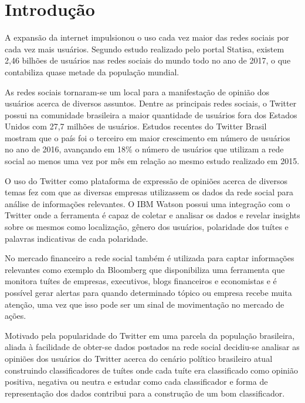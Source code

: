 \chapter{Introdução}

A expansão da internet impulsionou o uso cada vez maior das redes sociais por cada vez mais
usuários. Segundo estudo realizado pelo portal Statisa\cite{statisa}, existem
2,46 bilhões de usuários nas redes sociais do mundo todo no ano de 2017, o que contabiliza
quase metade da população mundial.

As redes sociais tornaram-se um local para a manifestação de opinião dos usuários acerca de
diversos assuntos. Dentre as principais redes sociais, o Twitter possui na comunidade brasileira
a maior quantidade de usuários fora dos Estados Unidos com 27,7 milhões de usuários.
Estudos recentes do Twitter Brasil mostram que o país foi o terceiro em maior crescimento em número
de usuários no ano de 2016, avançando em 18\% o número de usuários que utilizam a rede social ao
menos uma vez por mês em relação ao mesmo estudo realizado em 2015.\cite{twitterFolha}

O uso do Twitter como plataforma de expressão de opiniões acerca de diversos temas fez com que as
diversas empresas utilizassem os dados da rede social para análise de informações relevantes. O IBM
Watson possui uma integração com o Twitter onde a ferramenta é capaz de coletar e analisar os dados
e revelar insights sobre os mesmos como localização, gênero dos usuários, polaridade dos tuítes
e palavras indicativas de cada polaridade. \cite{twitterWatson}

No mercado financeiro a rede social também é utilizada para captar informações relevantes como exemplo
da Bloomberg que disponibiliza uma ferramenta que monitora tuítes de empresas, executivos, blogs
financeiros e economistas e é possível gerar alertas para quando determinado tópico ou empresa recebe
muita atenção, uma vez que isso pode ser um sinal de movimentação no mercado de ações.	\cite{twitterBloomberg}

Motivado pela popularidade do Twitter em uma parcela da população brasileira, aliada à facilidade
de obter-se dados postados na rede social decidiu-se analisar as opiniões dos usuários do Twitter
acerca do cenário político brasileiro atual construindo classificadores de tuítes onde cada
tuíte era classificado como opinião positiva, negativa ou neutra e estudar como
cada classificador e forma de representação dos dados contribui para a construção de um bom
classificador. 

